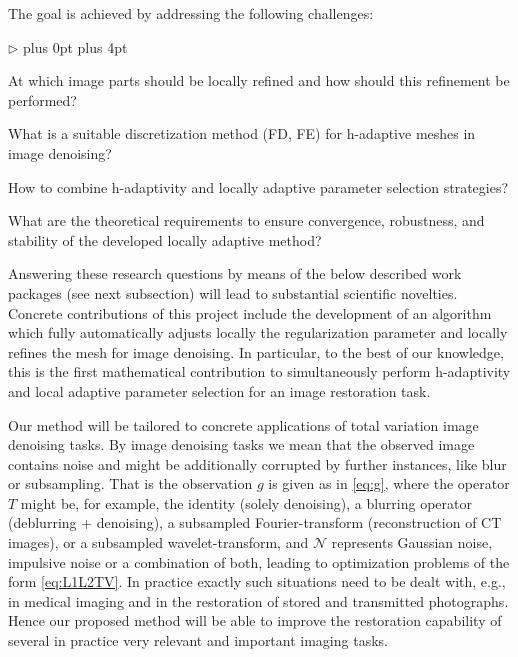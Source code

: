 \documentclass[enabledeprecatedfontcommands,cleardoublepage=empty,headsepline,twoside,11pt,DIV=15,BCOR=12mm,final]{scrartcl}
\renewenvironment{itemize}
{\begin{list}{$\triangleright$}{\labelwidth-2mm \leftmargin3mm %
  \itemsep5pt plus 0pt  \topsep3pt \parsep1pt plus 4pt \labelsep2mm}}
{\end{list}}
\begin{document}
The goal is achieved by addressing the following challenges:
\begin{itemize}
\item At which image parts should be locally refined and how should this refinement be performed?
\item What is a suitable discretization method (FD, FE) for h-adaptive meshes in image denoising?
\item How to combine h-adaptivity and locally adaptive parameter selection strategies? 
\item What are the theoretical requirements to ensure convergence, robustness, and stability of the developed locally adaptive method?
\end{itemize}
Answering these research questions by means of the below described work packages (see next subsection) will lead to substantial scientific novelties. Concrete contributions of this project include the development of an algorithm which fully automatically adjusts locally the regularization parameter and locally refines the mesh for image denoising. In particular, to the best of our knowledge, this is the first mathematical contribution to simultaneously perform h-adaptivity and local adaptive parameter selection for an image restoration task.

Our method will be tailored to concrete applications of total variation image denoising tasks. By image denoising tasks we mean that the observed image contains noise and might be additionally corrupted by further instances, like blur or subsampling. That is the observation $g$ is given as in \eqref{eq:g}, where the operator $T$ might be, for example, the identity (solely denoising), a blurring operator (deblurring + denoising), a subsampled Fourier-transform (reconstruction of CT images), or a subsampled wavelet-transform, and $\mathcal{N}$ represents Gaussian noise, impulsive noise or a combination of both, leading to optimization problems of the form \eqref{eq:L1L2TV}. %
In practice exactly such situations need to be dealt with, e.g., in medical imaging and in the restoration of stored and transmitted photographs. Hence our proposed method will be able to improve the restoration capability of several in practice very relevant and important imaging tasks.

\end{document}
